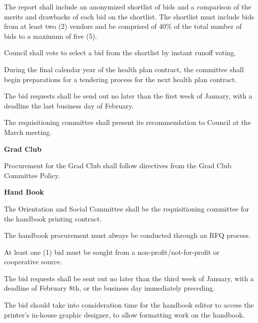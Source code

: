\begin{longenum}[label*=\thesection.\arabic*., align=left]
\begin{longenum} [label*=\arabic*., align=left]
\begin{longenum} [label*=\arabic*., align=left]
		\item 	The report shall include an anonymized shortlist of bids and a comparison of the merits and drawbacks of each bid on the shortlist. The shortlist must include bids from at least two (2) vendors and be comprised of 40\% of the total number of bids to a maximum of five (5).
		
		\item Council shall vote to select a bid from the shortlist by instant runoff voting.
			
		\item 	During the final calendar year of the health plan contract, the committee shall begin preparations for a tendering process for the next health plan contract.
			
		\item 	The bid requests shall be send out no later than the first week of January, with a deadline the last business day of February.
			
		\item 	The requisitioning committee shall present its recommendation to Council at the March meeting. 
			
	\end{longenum}	
\item \textbf{Grad Club}
\begin{longenum} [label*=\arabic*., align=left]
	\item Procurement for the Grad Club shall follow directives from the Grad Club Committee Policy.
\end{longenum}	
\item \textbf{Hand Book}
\begin{longenum} [label*=\arabic*., align=left]
	\item The Orientation and Social Committee shall be the requisitioning committee for the handbook printing contract.
	
	\item The handbook procurement must always be conducted through an RFQ process.
	
	\item At least one (1) bid must be sought from a non-profit/not-for-profit or cooperative source.
	
	\item The bid requests shall be sent out no later than the third week of January, with a deadline of February 8th, or the business day immediately preceding.
	
	\item The bid should take into consideration time for the handbook editor to access the printer's in-house graphic designer, to allow formatting work on the handbook.
\end{longenum}
\end{longenum}

\end{longenum}
